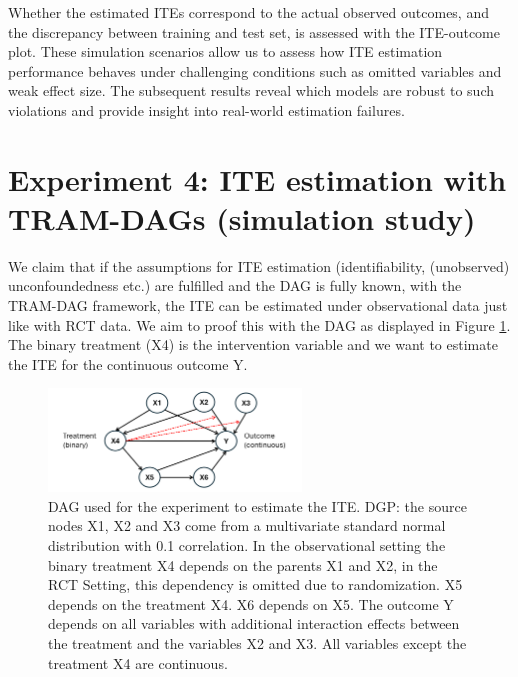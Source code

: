 Whether the estimated ITEs correspond to the actual observed outcomes, and the discrepancy between training and test set, is assessed with the ITE-outcome plot.
These simulation scenarios allow us to assess how ITE estimation performance behaves under challenging conditions such as omitted variables and weak effect size. The subsequent results reveal which models are robust to such violations and provide insight into real-world estimation failures.






\section{Experiment 4: ITE estimation with TRAM-DAGs (simulation study)} \label{sec:methods_experiment4}



We claim that if the assumptions for ITE estimation (identifiability, (unobserved) unconfoundedness etc.) are fulfilled and the DAG is fully known, with the TRAM-DAG framework, the ITE can be estimated under observational data just like with RCT data. We aim to proof this with the DAG as displayed in Figure \ref{fig:ite_dag_observational}. The binary treatment (X4) is the intervention variable and we want to estimate the ITE for the continuous outcome Y. 


\begin{figure}[H]
\centering
\includegraphics[width=0.6\textwidth]{img/dag_ITE_observational.png}
\caption{DAG used for the experiment to estimate the ITE. DGP: the source nodes X1, X2 and X3 come from a multivariate standard normal distribution with 0.1 correlation. In the observational setting the binary treatment X4 depends on the parents X1 and X2, in the RCT Setting, this dependency is omitted due to randomization. X5 depends on the treatment X4. X6 depends on X5. The outcome Y depends on all variables with additional interaction effects between the treatment and the variables X2 and X3. All variables except the treatment X4 are continuous.}
\label{fig:ite_dag_observational}
\end{figure}

